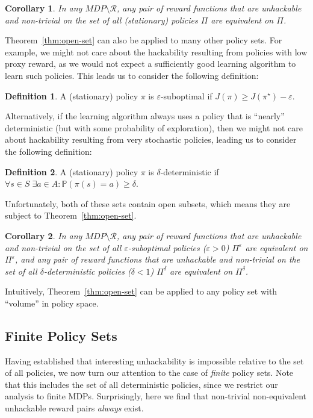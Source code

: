 \documentclass{article}
\newtheorem{corollary}{Corollary}
\theoremstyle{definition}
\newtheorem{definition}{Definition}
\theoremstyle{remark}
\begin{document}
\begin{corollary}
In any $MDP \setminus \mathcal{R}$, any pair of reward functions that are unhackable and non-trivial on the set of all (stationary) policies $\Pi$ are equivalent on $\Pi$.
\end{corollary}

Theorem~\ref{thm:open-set} can also be applied to many other policy sets.
For example, we might not care about the hackability resulting from policies with low proxy reward, as we would not expect a sufficiently good learning algorithm to learn such policies.
This leads us to consider the following definition:

\newpage

\begin{definition}
A (stationary) policy $\pi$ is $\varepsilon$-suboptimal if $J(\pi) \geq J(\pi^\star) - \varepsilon$.
\end{definition}

Alternatively, if the learning algorithm always uses a policy that is \enquote{nearly} deterministic (but with some probability of exploration), then we might not care about hackability resulting from very stochastic policies, leading us to consider the following definition:

\begin{definition}
A (stationary) policy $\pi$ is $\delta$-deterministic if $\forall s \in S \; \exists a \in A: \mathbb{P}(\pi(s) = a) \geq \delta$.
\end{definition}

Unfortunately, both of these sets contain open subsets, which means they are subject to Theorem~\ref{thm:open-set}.%

\begin{corollary}
\label{corollary:approximately_optimal}
In any $MDP \setminus \mathcal{R}$, any pair of reward functions that are unhackable and non-trivial on the set of all $\varepsilon$-suboptimal policies ($\varepsilon>0$) $\Pi^\varepsilon$ are equivalent on $\Pi^\varepsilon$, and any pair of reward functions that are unhackable and non-trivial on the set of all $\delta$-deterministic policies ($\delta<1$) $\Pi^\delta$ are equivalent on $\Pi^\delta$.
\end{corollary}

Intuitively, Theorem~\ref{thm:open-set} can be applied to any policy set with \enquote{volume} in policy space.




\subsection{Finite Policy Sets}\label{sec:results_finite}
Having established that interesting unhackability is impossible relative to the set of all policies, we now turn our attention to the case of \emph{finite} policy sets.
Note that this includes the set of all deterministic policies, since we restrict our analysis to finite MDPs.
Surprisingly, here we find that non-trivial non-equivalent unhackable reward pairs \textit{always} exist.
\end{document}
